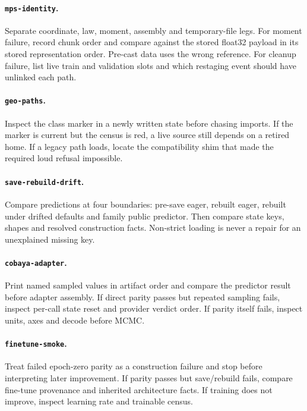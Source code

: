 \documentclass[10pt,aps,prd,twocolumn,nofootinbib]{revtex4-2}
\newcommand{\code}[1]{\texttt{#1}}
\begin{document}
\paragraph{\code{mps-identity}.}
Separate coordinate, law, moment, assembly and temporary-file legs.  For
moment failure, record chunk order and compare against the stored float32
payload in its stored representation order.  Pre-cast data uses the wrong
reference.  For cleanup failure, list live train and
validation slots and which restaging event should have unlinked each path.

\paragraph{\code{geo-paths}.}
Inspect the class marker in a newly written state before chasing imports.  If
the marker is current but the census is red, a live source still depends on a
retired home.  If a legacy path loads, locate the compatibility shim that made
the required loud refusal impossible.

\paragraph{\code{save-rebuild-drift}.}
Compare predictions at four boundaries: pre-save eager, rebuilt eager,
rebuilt under drifted defaults and family public predictor.  Then compare
state keys, shapes and resolved construction facts.  Non-strict loading is
never a repair for an unexplained missing key.

\paragraph{\code{cobaya-adapter}.}
Print named sampled values in artifact order and compare the predictor result
before adapter assembly.  If direct parity passes but repeated sampling fails,
inspect per-call state reset and provider verdict order.  If parity itself
fails, inspect units, axes and decode before MCMC.

\paragraph{\code{finetune-smoke}.}
Treat failed epoch-zero parity as a construction failure and stop before
interpreting later improvement.  If parity passes but save/rebuild fails,
compare fine-tune provenance and inherited architecture facts.  If training
does not improve, inspect learning rate and trainable census.
\end{document}
